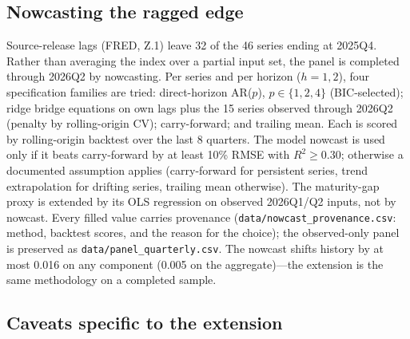 \documentclass[11pt]{article}
\begin{document}
\subsection{Nowcasting the ragged edge}

Source-release lags (FRED, Z.1) leave 32 of the 46 series ending at 2025Q4.
Rather than averaging the index over a partial input set, the panel is
completed through 2026Q2 by nowcasting.  Per series and per horizon
($h=1,2$), four specification families are tried: direct-horizon AR($p$),
$p\in\{1,2,4\}$ (BIC-selected); ridge bridge equations on own lags plus
the 15 series observed through 2026Q2 (penalty by rolling-origin CV);
carry-forward; and trailing mean.  Each is scored by rolling-origin
backtest over the last 8 quarters.  The model nowcast is used only if it
beats carry-forward by at least 10\% RMSE with $R^2\ge0.30$; otherwise a
documented assumption applies (carry-forward for persistent series,
trend extrapolation for drifting series, trailing mean otherwise).  The
maturity-gap proxy is extended by its OLS regression on observed 2026Q1/Q2
inputs, not by nowcast.  Every filled value carries provenance
(\texttt{data/nowcast\_provenance.csv}: method, backtest scores, and the
reason for the choice); the observed-only panel is preserved as
\texttt{data/panel\_quarterly.csv}.  The nowcast shifts history by at most
0.016 on any component (0.005 on the aggregate)---the extension is the same
methodology on a completed sample.

\subsection{Caveats specific to the extension}
\end{document}
